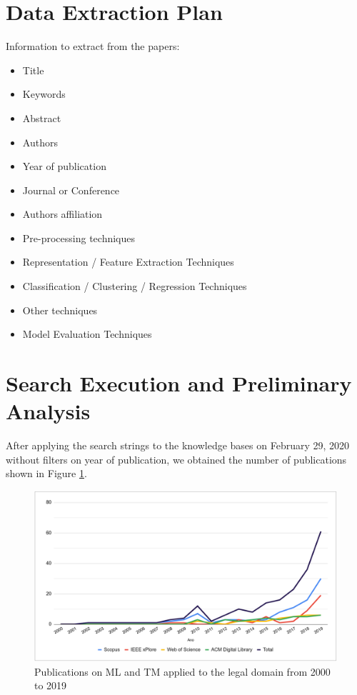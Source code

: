 \section{Data Extraction Plan}

Information to extract from the papers:

\begin{itemize}[noitemsep]
    \item Title
    \item Keywords
    \item Abstract
    \item Authors
    \item Year of publication
    \item Journal or Conference
    \item Authors affiliation
    \item Pre-processing techniques
    \item Representation / Feature Extraction Techniques
    \item Classification  / Clustering / Regression Techniques
    \item Other techniques
    \item Model Evaluation Techniques
\end{itemize}


\section{Search Execution and Preliminary Analysis}

After applying the search strings to the knowledge bases on February 29, 2020 without filters on year of publication, we obtained the number of publications shown in Figure \ref{fig:ap_rsl_tm_law}.

\begin{figure}[H]
    \centering
    \caption{Publications on ML and TM applied to the legal domain from 2000 to 2019}
    \label{fig:ap_rsl_tm_law}
    \includegraphics[width=\textwidth]{images/appendix/artigos_tm_law.png}
\end{figure}

